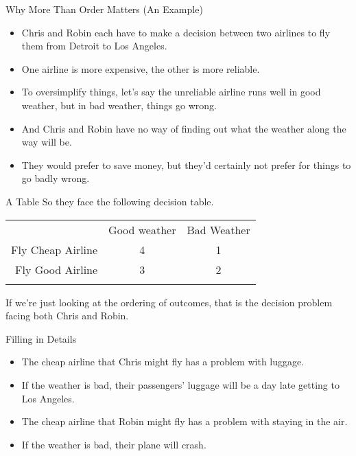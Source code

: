 \documentclass[
  ignorenonframetext,
]{beamer}
\providecommand{\tightlist}{%
  \setlength{\itemsep}{0pt}\setlength{\parskip}{0pt}}
\renewcommand{\,}{\text{, }}
\begin{document}
\begin{frame}{Why More Than Order Matters (An Example)}
\protect\hypertarget{why-more-than-order-matters-an-example}{}
\begin{itemize}
\tightlist
\item
  Chris and Robin each have to make a decision between two airlines to
  fly them from Detroit to Los Angeles.
\item
  One airline is more expensive, the other is more reliable.
\item
  To oversimplify things, let's say the unreliable airline runs well in
  good weather, but in bad weather, things go wrong.
\item
  And Chris and Robin have no way of finding out what the weather along
  the way will be.
\item
  They would prefer to save money, but they'd certainly not prefer for
  things to go badly wrong.
\end{itemize}
\end{frame}

\begin{frame}{A Table}
\protect\hypertarget{a-table}{}
So they face the following decision table.

\begin{longtable}[]{@{}rcc@{}}
\toprule
& Good weather & Bad Weather \\ \addlinespace
\midrule
\endhead
Fly Cheap Airline & 4 & 1 \\ \addlinespace
Fly Good Airline & 3 & 2 \\ \addlinespace
\bottomrule
\end{longtable}

If we're just looking at the ordering of outcomes, that is the decision
problem facing both Chris and Robin.
\end{frame}

\begin{frame}{Filling in Details}
\protect\hypertarget{filling-in-details}{}
\begin{itemize}
\tightlist
\item
  The cheap airline that Chris might fly has a problem with luggage.
\item
  If the weather is bad, their passengers' luggage will be a day late
  getting to Los Angeles. \pause 
\item
  The cheap airline that Robin might fly has a problem with staying in
  the air.
\item
  If the weather is bad, their plane will crash.
\end{itemize}
\end{frame}
\end{document}
